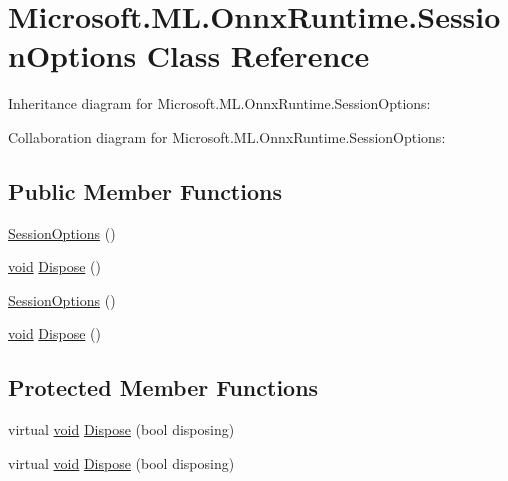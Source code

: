 \hypertarget{classMicrosoft_1_1ML_1_1OnnxRuntime_1_1SessionOptions}{}\section{Microsoft.\+M\+L.\+Onnx\+Runtime.\+Session\+Options Class Reference}
\label{classMicrosoft_1_1ML_1_1OnnxRuntime_1_1SessionOptions}


Inheritance diagram for Microsoft.\+M\+L.\+Onnx\+Runtime.\+Session\+Options\+:


Collaboration diagram for Microsoft.\+M\+L.\+Onnx\+Runtime.\+Session\+Options\+:
\subsection*{Public Member Functions}
\begin{DoxyCompactItemize}
\item 
\mbox{\hyperlink{classMicrosoft_1_1ML_1_1OnnxRuntime_1_1SessionOptions_a3661a9f1fde8ab9a61e4dd23d8d0d2c2}{Session\+Options}} ()
\item 
\mbox{\hyperlink{mlasi_8h_a88f941d423cb2a819b70a1358982b1a6}{void}} \mbox{\hyperlink{classMicrosoft_1_1ML_1_1OnnxRuntime_1_1SessionOptions_a12d86d50f88f574c5b53e1f590789dd3}{Dispose}} ()
\item 
\mbox{\hyperlink{classMicrosoft_1_1ML_1_1OnnxRuntime_1_1SessionOptions_a3661a9f1fde8ab9a61e4dd23d8d0d2c2}{Session\+Options}} ()
\item 
\mbox{\hyperlink{mlasi_8h_a88f941d423cb2a819b70a1358982b1a6}{void}} \mbox{\hyperlink{classMicrosoft_1_1ML_1_1OnnxRuntime_1_1SessionOptions_a12d86d50f88f574c5b53e1f590789dd3}{Dispose}} ()
\end{DoxyCompactItemize}
\subsection*{Protected Member Functions}
\begin{DoxyCompactItemize}
\item 
virtual \mbox{\hyperlink{mlasi_8h_a88f941d423cb2a819b70a1358982b1a6}{void}} \mbox{\hyperlink{classMicrosoft_1_1ML_1_1OnnxRuntime_1_1SessionOptions_a819d352e4cb1b184406f7b5675ca375a}{Dispose}} (bool disposing)
\item 
virtual \mbox{\hyperlink{mlasi_8h_a88f941d423cb2a819b70a1358982b1a6}{void}} \mbox{\hyperlink{classMicrosoft_1_1ML_1_1OnnxRuntime_1_1SessionOptions_a819d352e4cb1b184406f7b5675ca375a}{Dispose}} (bool disposing)
\end{DoxyCompactItemize}
